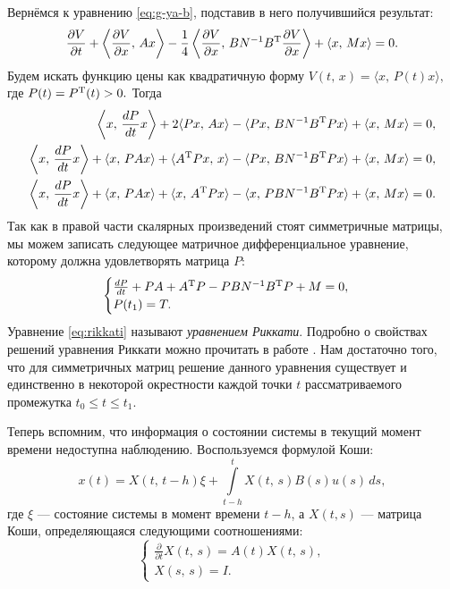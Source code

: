 Вернёмся к уравнению \eqref{eq:g-ya-b}, подставив в него получившийся результат:
$$
        \frac{\partial V}{\partial t}
        +
        \left\langle
        \frac{\partial V}{\partial x},\,Ax
        \right\rangle
        -
        \frac{1}{4}
        \left\langle
        \frac{\partial V}{\partial x},\,
        BN^{-1}B^\mathrm{T}\frac{\partial V}{\partial x}
        \right\rangle
        +
        \langle
        x,\,Mx
        \rangle
        = 0.
$$
Будем искать функцию цены как квадратичную форму
$
        V(t,\,x)
        =
        \langle x,\,P(t)x\rangle,
$
где
$
        P(t) = P^\mathrm{T}(t) > 0.
$
Тогда
\begin{align*}
\left\langle
x,\,\frac{dP}{dt} x
\right\rangle
+
2\langle
Px,\,Ax
\rangle
-
\langle
Px,\,BN^{-1}B^\mathrm{T} P x
\rangle
+
\langle
x,\,Mx
\rangle
&= 0,
\\
\left\langle
x,\,\frac{dP}{dt} x
\right\rangle
+
\langle
x,\,PAx
\rangle
+
\langle
A^\mathrm{T} P x,\,x
\rangle
-
\langle
Px,\,BN^{-1}B^\mathrm{T} P x
\rangle
+
\langle
x,\,Mx
\rangle
&= 0,
\\
\left\langle
x,\,\frac{dP}{dt} x
\right\rangle
+
\langle
x,\,PAx
\rangle
+
\langle
x,\,A^\mathrm{T} P x
\rangle
-
\langle
x,\,PBN^{-1}B^\mathrm{T} P x
\rangle
+
\langle
x,\,Mx
\rangle
&= 0.
\end{align*}
Так как в правой части скалярных произведений стоят симметричные матрицы, мы можем записать следующее матричное дифференциальное уравнение, которому должна удовлетворять матрица $P$:
\begin{equation}\label{eq:rikkati}
\begin{cases}
\frac{dP}{dt} + PA + A^\mathrm{T} P - PBN^{-1}B^\mathrm{T} P + M = 0,\\
P(t_1) = T.
\end{cases}
\end{equation}
Уравнение \eqref{eq:rikkati} называют \textit{уравнением Риккати}. Подробно о свойствах решений уравнения Риккати можно прочитать в работе \cite{egorov}. Нам достаточно того, что для симметричных матриц решение данного уравнения существует и единственно в некоторой окрестности каждой точки $t$ рассматриваемого промежутка $t_0\leqslant t\leqslant t_1$.

Теперь вспомним, что информация о состоянии системы в текущий момент времени недоступна наблюдению. Воспользуемся формулой Коши:
$$
x(t) = X(t,\,t-h)\xi + \int\limits_{t-h}^{t}X(t,\,s)B(s)u(s)\,ds,
$$
где $\xi$ --- состояние системы в момент времени $t- h$, а $X(t, s)$ --- матрица Коши, определяющаяся следующими соотношениями:
$$
        \begin{cases}
\frac{\partial}{\partial t}X(t,\,s) = A(t)X(t,\,s),\\
X(s,\,s) = I.
        \end{cases}
$$

